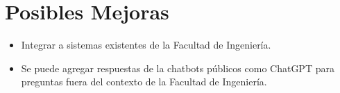 \section{Posibles Mejoras}
\begin{itemize}
	\item Integrar a sistemas existentes de la Facultad de Ingeniería.
	\item Se puede agregar respuestas de la chatbots públicos como	ChatGPT \cite{api_chatgpt}
	      para preguntas
	      fuera del
	      contexto de la Facultad de Ingeniería.
\end{itemize}